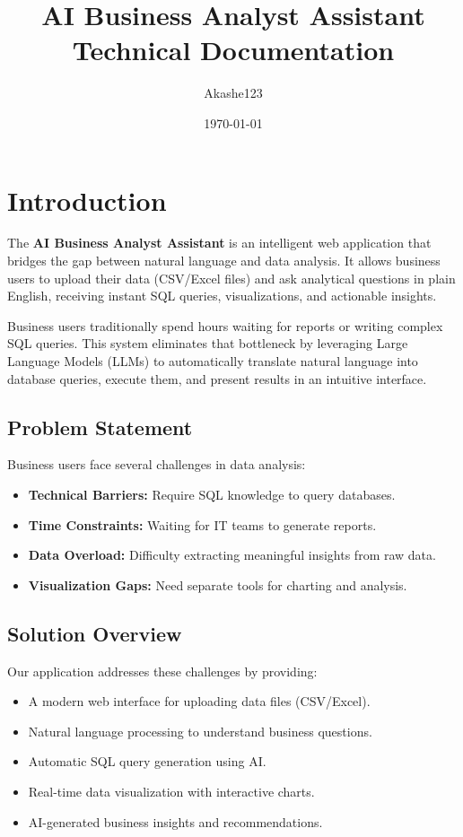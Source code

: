 \documentclass[12pt,a4paper]{article}
\title{
    \vspace{-2cm}
    \textbf{AI Business Analyst Assistant}\\
    \large Technical Documentation
}
\author{Akashe123}
\date{\today}
\begin{document}
\maketitle
\thispagestyle{empty}
\newpage

\tableofcontents
\newpage

\section{Introduction}

The \textbf{AI Business Analyst Assistant} is an intelligent web application that bridges the gap between natural language and data analysis. It allows business users to upload their data (CSV/Excel files) and ask analytical questions in plain English, receiving instant SQL queries, visualizations, and actionable insights.

Business users traditionally spend hours waiting for reports or writing complex SQL queries. This system eliminates that bottleneck by leveraging Large Language Models (LLMs) to automatically translate natural language into database queries, execute them, and present results in an intuitive interface.

\subsection{Problem Statement}
Business users face several challenges in data analysis:
\begin{itemize}
    \item \textbf{Technical Barriers:} Require SQL knowledge to query databases.
    \item \textbf{Time Constraints:} Waiting for IT teams to generate reports.
    \item \textbf{Data Overload:} Difficulty extracting meaningful insights from raw data.
    \item \textbf{Visualization Gaps:} Need separate tools for charting and analysis.
\end{itemize}

\subsection{Solution Overview}
Our application addresses these challenges by providing:
\begin{itemize}
    \item A modern web interface for uploading data files (CSV/Excel).
    \item Natural language processing to understand business questions.
    \item Automatic SQL query generation using AI.
    \item Real-time data visualization with interactive charts.
    \item AI-generated business insights and recommendations.
\end{itemize}
\end{document}
